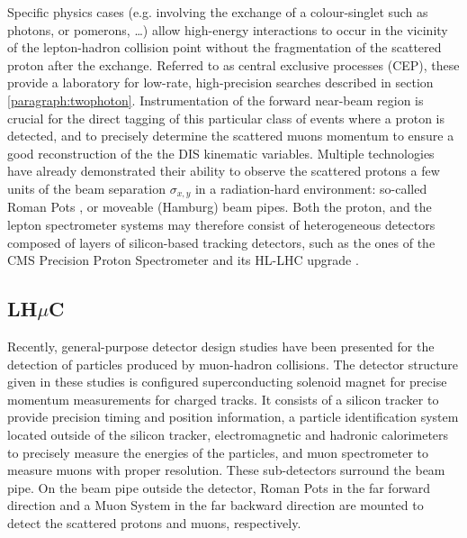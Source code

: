 Specific physics cases (e.g. involving the exchange of a colour-singlet such as photons, or pomerons, \ldots) allow high-energy interactions to occur in the vicinity of the lepton-hadron collision point without the fragmentation of the scattered proton after the exchange.
Referred to as central exclusive processes (CEP), these provide a laboratory for low-rate, high-precision searches described in section \ref{paragraph:twophoton}.
Instrumentation of the forward near-beam region is crucial for the direct tagging of this particular class of events where a proton is detected, and to precisely determine the scattered muons momentum to ensure a good reconstruction of the the DIS kinematic variables.
Multiple technologies have already demonstrated their ability to observe the scattered protons a few units of the beam separation $\sigma_{x,y}$ in a radiation-hard environment: so-called Roman Pots \cite{CMS:2024xbs,ATLAS:2024ztz}, or moveable (Hamburg) beam pipes.
Both the proton, and the lepton spectrometer systems may therefore consist of heterogeneous detectors composed of layers of silicon-based tracking detectors, such as the ones of the CMS Precision Proton Spectrometer \cite{CMS:2014sdw} and its HL-LHC upgrade \cite{CMS:2021ncv}.



\subsection{\texorpdfstring{LH$\mu$C}{LHuC}}
\label{subsec:detLHuC}

Recently, general-purpose detector design studies have been presented for the detection of particles produced by muon-hadron collisions\cite{Acosta:2023,Akturk:2025ubm}. The detector structure given in these studies is configured superconducting solenoid magnet for precise momentum measurements for charged tracks. It consists of a silicon tracker to provide precision timing and position information, a particle identification system located outside of the silicon tracker, electromagnetic and hadronic calorimeters to precisely measure the energies of the particles, and muon spectrometer to measure muons with proper resolution. These sub-detectors surround the beam pipe. On the beam pipe outside the detector, Roman Pots in the far forward direction and a Muon System in the far backward direction are mounted to detect the scattered protons and muons, respectively. 

